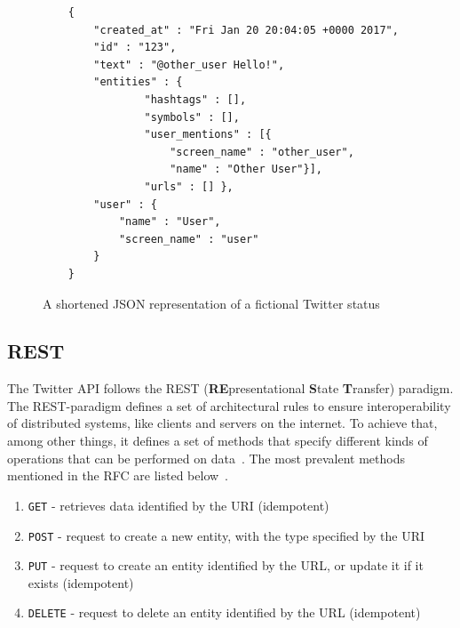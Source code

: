 
\begin{figure}
    \caption{A shortened JSON representation of a fictional Twitter status}
    \label{code:json}
    \begin{verbatim}
    {
        "created_at" : "Fri Jan 20 20:04:05 +0000 2017",
        "id" : "123",
        "text" : "@other_user Hello!",
        "entities" : {
                "hashtags" : [],
                "symbols" : [],
                "user_mentions" : [{
                    "screen_name" : "other_user",
                    "name" : "Other User"}],
                "urls" : [] },
        "user" : {
            "name" : "User",
            "screen_name" : "user"
        }
    }
    \end{verbatim}
\end{figure}

\subsection{REST}
\label{subsec:rest}

The Twitter API follows the REST (\textbf{RE}presentational \textbf{S}tate \textbf{T}ransfer) paradigm.
The REST-paradigm defines a set of architectural rules to ensure interoperability of distributed systems,
like clients and servers on the internet.
To achieve that, among other things,
it defines a set of methods that specify different kinds of operations that can be performed on data~\cite{Jakl2008}.
The most prevalent methods mentioned in the RFC are listed below~\cite{RFC2616}.

\begin{enumerate}
    \item
    \texttt{GET} - retrieves data identified by the URI (idempotent)
    \item
    \texttt{POST} - request to create a new entity, with the type specified by the URI
    \item
    \texttt{PUT} - request to create an entity identified by the URL, or update it if it exists (idempotent)
    \item
    \texttt{DELETE} - request to delete an entity identified by the URL (idempotent)
\end{enumerate}

